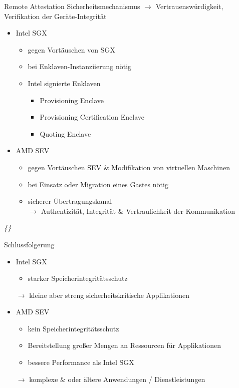 \documentclass{sdqbeamer}
\begin{document}
\begin{frame}{Remote Attestation}
	Sicherheitsmechanismus \(\rightarrow\) Vertrauenswürdigkeit, Verifikation der Geräte-Integrität
	\begin{itemize}
		\item Intel SGX
		\begin{itemize}
			\item gegen Vortäuschen von SGX
			\item bei Enklaven-Instanziierung nötig
			\item Intel signierte Enklaven
			\begin{itemize}
				\item Provisioning Enclave
				\item Provisioning Certification Enclave
				\item Quoting Enclave 
			\end{itemize}
		\end{itemize}
		\item AMD SEV
		\begin{itemize}
			\item gegen Vortäuschen SEV \& Modifikation von virtuellen Maschinen
			\item bei Einsatz oder Migration eines Gastes nötig
			\item sicherer Übertragungskanal\\
				\(\rightarrow\) Authentizität, Integrität \& Vertraulichkeit der Kommunikation
		\end{itemize}
	\end{itemize}
	\vfill
	\small\textit{\{\cite{knauth, swami, buhren}\}}
\end{frame}

\begin{frame}{Schlussfolgerung}
	\begin{itemize}
		\item Intel SGX
		\begin{itemize}
			\item starker Speicherintegritätsschutz
		\end{itemize}
			\(\rightarrow\) kleine aber streng sicherheitskritische Applikationen
		\item AMD SEV
		\begin{itemize}
			\item kein Speicherintegritätsschutz
			\item Bereitstellung großer Mengen an Ressourcen für Applikationen
			\item bessere Performance als Intel SGX
		\end{itemize}
			\(\rightarrow\) komplexe \& oder ältere Anwendungen / Dienstleistungen
	\end{itemize}
\end{frame}
\end{document}

